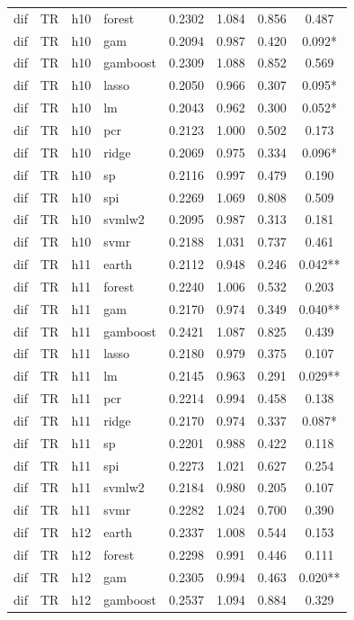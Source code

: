 \begin{ThreePartTable}
\begin{longtable}[t]{llclcccc}
dif & TR & h10 & forest & 0.2302 & 1.084 & 0.856 & 0.487\\
dif & TR & h10 & gam & 0.2094 & 0.987 & 0.420 & 0.092*\\
dif & TR & h10 & gamboost & 0.2309 & 1.088 & 0.852 & 0.569\\
dif & TR & h10 & lasso & 0.2050 & 0.966 & 0.307 & 0.095*\\
dif & TR & h10 & lm & 0.2043 & 0.962 & 0.300 & 0.052*\\
dif & TR & h10 & pcr & 0.2123 & 1.000 & 0.502 & 0.173\\
dif & TR & h10 & ridge & 0.2069 & 0.975 & 0.334 & 0.096*\\
dif & TR & h10 & sp & 0.2116 & 0.997 & 0.479 & 0.190\\
dif & TR & h10 & spi & 0.2269 & 1.069 & 0.808 & 0.509\\
dif & TR & h10 & svmlw2 & 0.2095 & 0.987 & 0.313 & 0.181\\
dif & TR & h10 & svmr & 0.2188 & 1.031 & 0.737 & 0.461\\
\addlinespace
dif & TR & h11 & earth & 0.2112 & 0.948 & 0.246 & 0.042**\\
dif & TR & h11 & forest & 0.2240 & 1.006 & 0.532 & 0.203\\
dif & TR & h11 & gam & 0.2170 & 0.974 & 0.349 & 0.040**\\
dif & TR & h11 & gamboost & 0.2421 & 1.087 & 0.825 & 0.439\\
dif & TR & h11 & lasso & 0.2180 & 0.979 & 0.375 & 0.107\\
dif & TR & h11 & lm & 0.2145 & 0.963 & 0.291 & 0.029**\\
dif & TR & h11 & pcr & 0.2214 & 0.994 & 0.458 & 0.138\\
dif & TR & h11 & ridge & 0.2170 & 0.974 & 0.337 & 0.087*\\
dif & TR & h11 & sp & 0.2201 & 0.988 & 0.422 & 0.118\\
dif & TR & h11 & spi & 0.2273 & 1.021 & 0.627 & 0.254\\
dif & TR & h11 & svmlw2 & 0.2184 & 0.980 & 0.205 & 0.107\\
dif & TR & h11 & svmr & 0.2282 & 1.024 & 0.700 & 0.390\\
\addlinespace
dif & TR & h12 & earth & 0.2337 & 1.008 & 0.544 & 0.153\\
dif & TR & h12 & forest & 0.2298 & 0.991 & 0.446 & 0.111\\
dif & TR & h12 & gam & 0.2305 & 0.994 & 0.463 & 0.020**\\
dif & TR & h12 & gamboost & 0.2537 & 1.094 & 0.884 & 0.329\\

\end{longtable}
\end{ThreePartTable}
